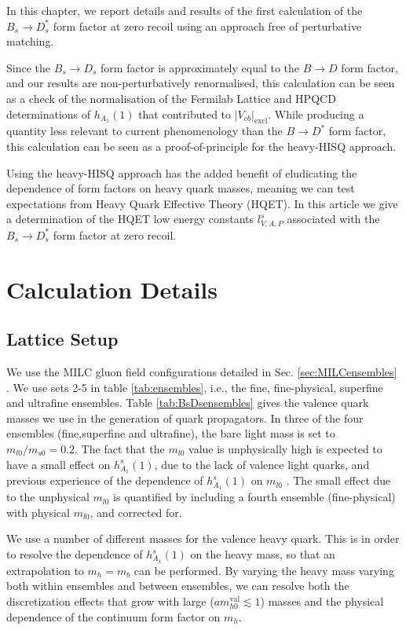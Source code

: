 In this chapter, we report details and results of the first calculation of the $B_s\to D^*_s$ form factor at zero recoil using an approach free of perturbative matching. 

Since the $B_s\to D_s$ form factor is approximately equal to the $B\to D$ form factor, and our results are non-perturbatively renormalised, this calculation can be seen as a check of the normalisation of the Fermilab Lattice and HPQCD determinations of $h_{A_1}(1)$ that contributed to $|V_{cb}|_{\text{excl}}$. While producing a quantity less relevant to current phenomenology than the $B\to D^*$ form factor, this calculation can be seen as a proof-of-principle for the heavy-HISQ approach. 

Using the heavy-HISQ approach has the added benefit of eludicating the dependence of form factors on heavy quark masses, meaning we can test expectations from Heavy Quark Effective Theory (HQET). In this article we give a determination of the HQET low energy constants $l_{V,A,P}^s$ associated with the $B_s \to D_s^*$ form factor at zero recoil.

\section{Calculation Details}
\label{sec:BsDsstar_deets}

\subsection{Lattice Setup}

We use the MILC gluon field configurations detailed in Sec. \ref{sec:MILCensembles} \cite{Bazavov:2010ru,Bazavov:2012xda}. We use sets 2-5 in table \ref{tab:ensembles}, i.e., the fine, fine-physical, superfine and ultrafine ensembles. Table \ref{tab:BsDsensembles} gives the valence quark masses we use in the generation of quark propagators. In three of the four ensembles (fine,superfine and ultrafine), the bare light mass is set to $m_{l0}/m_{s0} = 0.2$. The fact that the $m_{l0}$ value is unphysically high is expected to have a small effect on $h^s_{A_1}(1)$, due to the lack of valence light quarks, and previous experience of the dependence of $h_{A_1}^s(1)$ on $m_{l0}$ \cite{Harrison:2017fmw}. The small effect due to the unphysical $m_{l0}$ is quantified by including a fourth ensemble (fine-physical) with physical $m_{l0}$, and corrected for.

We use a number of different masses for the valence heavy quark. This is in order to resolve the dependence of $h_{A_1}^s(1)$ on the heavy mass, so that an extrapolation to $m_h=m_b$ can be performed. By varying the heavy mass varying both within ensembles and between ensembles, we can resolve both the discretization effects that grow with large ($am^{\text{val}}_{h0} \lesssim 1$) masses and the physical dependence of the continuum form factor on $m_h$.

